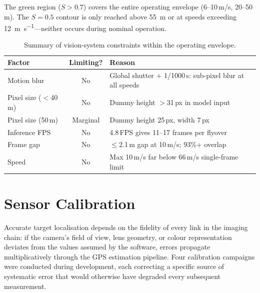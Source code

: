 \documentclass[10pt,a4paper]{article}
\begin{document}
The green region ($S > 0.7$) covers the entire operating envelope (6--10\,m/s, 20--50\,m). The $S = 0.5$ contour is only reached above \SI{55}{\metre} or at speeds exceeding \SI{12}{\metre\per\second}---neither occurs during nominal operation.

\begin{table}[ht]
  \centering
  \caption{Summary of vision-system constraints within the operating envelope.}\label{tab:limits}
  \begin{tabular}{@{}l c p{6.5cm}@{}}
    \toprule
    \textbf{Factor} & \textbf{Limiting?} & \textbf{Reason} \\
    \midrule
    Motion blur     & No  & Global shutter + 1/1000\,s: sub-pixel blur at all speeds \\
    Pixel size ($<$40\,m)  & No  & Dummy height $>$31\,px in model input \\
    Pixel size (50\,m)     & Marginal & Dummy height 25\,px, width 7\,px \\
    Inference FPS   & No  & 4.8\,FPS gives 11--17 frames per flyover \\
    Frame gap       & No  & $\leq$2.1\,m gap at 10\,m/s; 93\%+ overlap \\
    Speed           & No  & Max 10\,m/s far below 66\,m/s single-frame limit \\
    \bottomrule
  \end{tabular}
\end{table}



\section{Sensor Calibration}\label{sec:calibration}

Accurate target localisation depends on the fidelity of every link in the imaging chain: if the camera's field of view, lens geometry, or colour representation deviates from the values assumed by the software, errors propagate multiplicatively through the GPS estimation pipeline. Four calibration campaigns were conducted during development, each correcting a specific source of systematic error that would otherwise have degraded every subsequent measurement.
\end{document}

